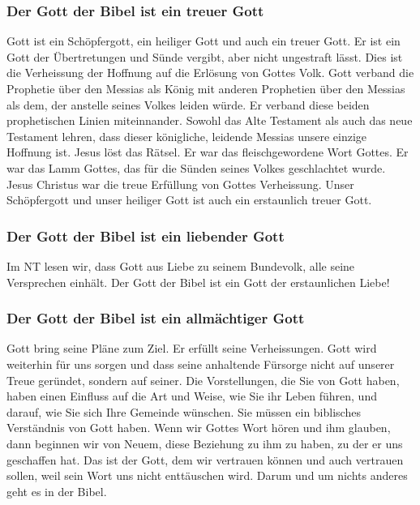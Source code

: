 \documentclass{../../inc/mybib}
\begin{document}
\subsubsection*{Der Gott der Bibel ist ein treuer Gott}
Gott ist ein Schöpfergott, ein heiliger Gott und auch ein treuer Gott. Er ist ein Gott der Übertretungen und Sünde vergibt, aber nicht ungestraft lässt. Dies ist die Verheissung der Hoffnung auf die Erlösung von Gottes Volk. Gott verband die Prophetie über den Messias als König mit anderen Prophetien über den Messias als dem, der anstelle seines Volkes leiden würde. Er verband diese beiden prophetischen Linien miteinnander. Sowohl das Alte Testament als auch das neue Testament lehren, dass dieser königliche, leidende Messias unsere einzige Hoffnung ist. Jesus löst das Rätsel. Er war das fleischgewordene Wort Gottes. Er war das Lamm Gottes, das für die Sünden seines Volkes geschlachtet wurde. Jesus Christus war die treue Erfüllung von Gottes Verheissung. Unser Schöpfergott und unser heiliger Gott ist auch ein erstaunlich treuer Gott.
\subsubsection*{Der Gott der Bibel ist ein liebender Gott}
Im NT lesen wir, dass Gott aus Liebe zu seinem Bundevolk, alle seine Versprechen einhält. Der Gott der Bibel ist ein Gott der erstaunlichen Liebe!
\subsubsection*{Der Gott der Bibel ist ein allmächtiger Gott}
Gott bring seine Pläne zum Ziel. Er erfüllt seine Verheissungen. Gott wird weiterhin für uns sorgen und dass seine anhaltende Fürsorge nicht auf unserer Treue geründet, sondern auf seiner. Die Vorstellungen, die Sie von Gott haben, haben einen Einfluss auf die Art und Weise, wie Sie ihr Leben führen, und darauf, wie Sie sich Ihre Gemeinde wünschen. Sie müssen ein biblisches Verständnis von Gott haben. Wenn wir Gottes Wort hören und ihm glauben, dann beginnen wir von Neuem, diese Beziehung zu ihm zu haben, zu der er uns geschaffen hat. Das ist der Gott, dem wir vertrauen können und auch vertrauen sollen, weil sein Wort uns nicht enttäuschen wird. Darum und um nichts anderes geht es in der Bibel.
\end{document}
